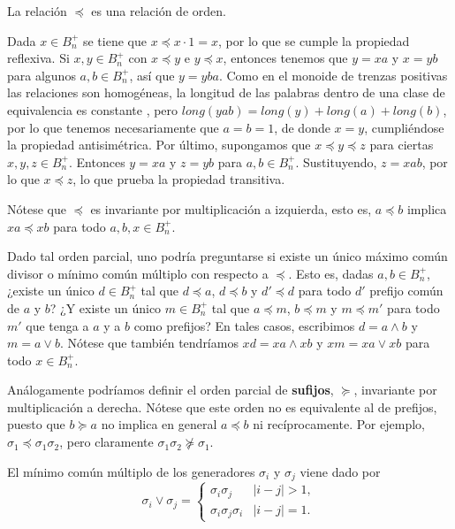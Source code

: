 \documentclass[bibtex, anon]{TEMat-article}
\begin{document}
\begin{lema}
	La relación $\preccurlyeq$ es una relación de orden.
\end{lema}
\begin{demostracion}
	Dada $x\in B_n^+$ se tiene que $x\preccurlyeq x\cdot 1=x$, por lo que se cumple la propiedad reflexiva. Si $x,y\in B_n^+$ con $x \preccurlyeq y $ e $y \preccurlyeq x$, entonces tenemos que $y=xa$ y $x=yb$ para algunos $a,b\in B_n^+$, así que $y=yba$. Como en el monoide de trenzas positivas las relaciones son homogéneas, la longitud de las palabras dentro de una clase de equivalencia es constante , pero $long(yab)=long(y)+long(a)+long(b)$, por lo que tenemos necesariamente que $a=b=1$, de donde $x=y$, cumpliéndose la propiedad antisimétrica. Por último, supongamos que $x\preccurlyeq y\preccurlyeq z$ para ciertas $x,y,z\in B_n^+$. Entonces $y=xa$ y $z=yb$ para $a,b\in B_n^+$. Sustituyendo, $z=xab$, por lo que $x\preccurlyeq z$, lo que prueba la propiedad transitiva. 
\end{demostracion}
Nótese que $\preccurlyeq$ es invariante por multiplicación a izquierda, esto es, $a\preccurlyeq b$ implica $xa\preccurlyeq xb$ para todo $a,b,x\in B_n^+$. %

Dado tal orden parcial, uno podría preguntarse si existe un único máximo común divisor o mínimo común múltiplo con respecto a $\preccurlyeq$. Esto es, dadas $a,b\in B_n^+$, ¿existe un único $d\in B_n^+$ tal que $d\preccurlyeq a$, $d\preccurlyeq b$ y $d'\preccurlyeq d$ para todo $d'$ prefijo común de $a$ y $b$? ¿Y existe un único $m\in B_n^+$ tal que $a\preccurlyeq m$, $b\preccurlyeq m$ y $m\preccurlyeq m'$ para todo $m'$ que tenga a $a$ y a $b$ como prefijos? En tales casos, escribimos $d=a\land b$ y $m=a\lor b$. Nótese que también tendríamos $xd=xa\land xb$ y $xm=xa\lor xb$ para todo $x\in B_n^+$.

\begin{nota}
	Análogamente podríamos definir el orden parcial de \textbf{sufijos}, $\succcurlyeq$, invariante por multiplicación a derecha. Nótese que este orden no es equivalente al de prefijos, puesto que $b\succcurlyeq a$ no implica en general $a\preccurlyeq b$ ni recíprocamente. Por ejemplo, $\sigma_1\preccurlyeq \sigma_1\sigma_2$, pero claramente $\sigma_1\sigma_2\not\succcurlyeq \sigma_1$.
\end{nota}


\begin{proposicion}\cite[Teorema 1.2]{Garside}
	El mínimo común múltiplo de los generadores $\sigma_i$ y $\sigma_j$ viene dado por
	$$\sigma_i\lor\sigma_j=\begin{cases}
	\sigma_i\sigma_j & |i-j|>1,\\
	\sigma_i\sigma_j\sigma_i & |i-j|=1.
	\end{cases}$$
\end{proposicion}
\end{document}
